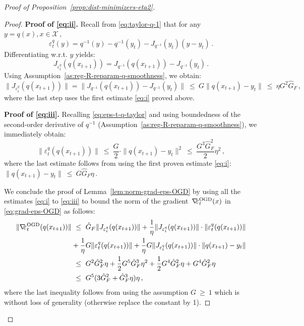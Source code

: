 \documentclass[a4paper,11pt,fullpage]{article}
\def\X{{\mathcal X}}
\theoremstyle{plain}
\theoremstyle{definition}
\theoremstyle{plain}
\renewcommand{\leq}{~\le~}
\renewcommand{\geq}{~\ge~}
\let\nablaold\nabla
\renewcommand{\nabla}{\nablaold\mkern-2.5mu}
\begin{document}
\begin{proof}[Proof of Proposition~\ref{prop:dist-minimizers-eta2}]
\begin{proof}
\noindent\textbf{Proof of \ref{eq:ii}.} Recall from \eqref{eq:taylor-q-1} that for any $y=q(x), x \in \X\,,$ 
\begin{equation}
\label{eq:eps-t-q-taylor}
\varepsilon_t^q(y) = q^{-1}(y)-q^{-1}(y_t) - J_{q^{-1}}(y_t)(y-y_t)\,.
\end{equation}
Differentiating w.r.t. $y$ yields: 
\begin{equation*}
J_{\varepsilon_t^q}(q(x_{t+1})) = J_{q^{-1}}(q(x_{t+1})) - J_{q^{-1}}(y_t)\,.
\end{equation*}
Using Assumption~\ref{as:reg-R-reparam-q-smoothness}, we obtain: 
\begin{equation*}
\|J_{\varepsilon_t^q}(q(x_{t+1}))\| = \|J_{q^{-1}}(q(x_{t+1})) - J_{q^{-1}}(y_t)\| \leq G \|q(x_{t+1}) - y_t\| \leq \eta G^2 \hat{G}_F\,,
\end{equation*}
where the last step uses the first estimate \ref{eq:i} proved above.

\noindent\textbf{Proof of \ref{eq:iii}.} Recalling \eqref{eq:eps-t-q-taylor} and using boundedness of the second-order derivative of $q^{-1}$ (Assumption~\ref{as:reg-R-reparam-q-smoothness}), we immediately obtain: 
\begin{equation*}
\|\varepsilon_t^q(q(x_{t+1}))\| \leq \frac{G}{2} \cdot \|q(x_{t+1}) - y_t\|^2 \leq \frac{G^3 \hat{G}_F^2}{2} \eta^2\,,
\end{equation*}
where the last estimate follows from using the first proven estimate \ref{eq:i}: $\|q(x_{t+1})-y_t\|\leq  G \hat{G}_F \eta\,.$

We conclude the proof of Lemma~\ref{lem:norm-grad-eps-OGD} by using all the estimates \ref{eq:i} to \ref{eq:iii} to bound the norm of the gradient~$\nabla\varepsilon_t^{\mathrm{OGD}}(x)$ in \eqref{eq:grad-eps-OGD} as follows:
\begin{align}
\label{eq:grad-eps-ogd}
\|\nabla\varepsilon_t^{\mathrm{OGD}}(q(x_{t+1}))\| 
&\leq \hat{G}_F \|J_{\varepsilon_t^q}(q(x_{t+1}))\| 
+ \frac{1}{\eta} \|J_{\varepsilon_t^q}(q(x_{t+1}))\| \cdot \|\varepsilon_t^q(q(x_{t+1}))\| \nonumber\\
&+ \frac{1}{\eta} G \|\varepsilon_t^q(q(x_{t+1}))\| + \frac{1}{\eta} G \|J_{\varepsilon_t^q}(q(x_{t+1}))\| \cdot \|q(x_{t+1})-y_t\| \nonumber\\
&\leq G^2  \hat{G}_F^2 \eta + \frac 12 G^5 \hat{G}_F^3 \eta^2 + \frac 12 G^4 \hat{G}_F^2 \eta + G^4 \hat{G}_F^2 \eta\,\nonumber\\
&\leq G^5 (3\hat{G}_F^2 + \hat{G}_F^3 \eta) \eta\,,
\end{align}
where the last inequality follows from using the assumption $G \geq 1$ which is without loss of generality (otherwise replace the constant by 1). 
\end{proof}


\end{proof}
\end{document}
